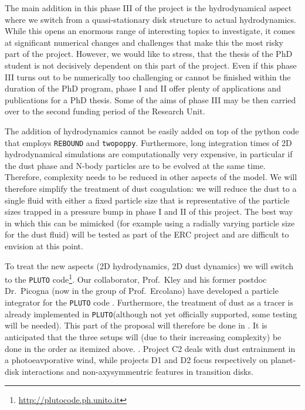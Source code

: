 \documentclass[10pt,fleqn,twoside]{article}
\newcommand{\twopoppy}{\texttt{twopoppy}\xspace}
\newcommand{\rebound}{\texttt{REBOUND}\xspace}
\newcommand{\pluto}{\texttt{PLUTO}\xspace}
\begin{document}
The main addition in this phase III of the project is the
hydrodynamical aspect where we switch from a quasi-stationary disk
structure to actual hydrodynamics. While this opens an enormous range
of interesting topics to investigate, it comes at significant
numerical changes and challenges that make this the most risky part of
the project. However, we would like to stress, that the thesis of the
PhD student is not decisively dependent on this part of the project.
Even if this phase III turns out to be numerically too challenging or
cannot be finished within the duration of the PhD program, phase I and
II offer plenty of applications and publications for a PhD
thesis. Some of the aims of phase III may be then carried over
to the second funding period of the Research Unit. 

The addition of hydrodynamics cannot be easily added on top of the
python code that employs \rebound and \twopoppy. Furthermore, long
integration times of 2D hydrodynamical simulations are computationally
very expensive, in particular if the dust phase and N-body particles
are to be evolved at the same time. Therefore, complexity needs to be
reduced in other aspects of the model. We will therefore simplify the
treatment of dust coagulation: we will reduce the dust to a single
fluid with either a fixed particle size that is representative of the
particle sizes trapped in a pressure bump in phase I and II of this
project. The best way in which this can be mimicked (for example using
a radially varying particle size for the dust fluid) will be tested as
part of the ERC project and are difficult to envision at this point.

To treat the new aspects (2D hydrodynamics, 2D dust dynamics) we will
switch to the \pluto
code\footnote{\url{http://plutocode.ph.unito.it}}. Our collaborator,
Prof.~Kley and his former postdoc Dr.\ Picogna (now in the group of
Prof.~Ercolano) have developed a particle integrator for the \pluto
code \citep[see][]{2015A&A...584A.110P}. Furthermore, the treatment of
dust as a tracer is already implemented in \pluto (although not yet
officially supported, some testing will be needed). This part of the
proposal will therefore be done in . It is
anticipated that the three setups will (due to their increasing
complexity) be done in the order as itemized above. . Project C2 deals with dust entrainment in a
photoeavporative wind, while projects D1 and D2 focus respectively on
planet-disk interactions and non-axysymmentric features in transition
disks. 
\end{document}
